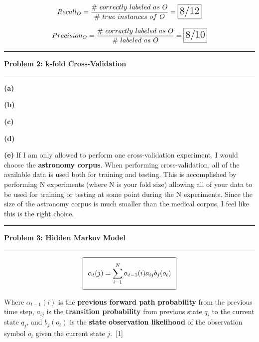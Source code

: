 \documentclass[11pt]{article}
\newcommand\question[2]{\vspace{.25in}\hrule\textbf{#1: #2}\vspace{.5em}\hrule\vspace{.10in}}
\renewcommand\part[1]{\vspace{.10in}\textbf{(#1)}}
\begin{document}
$$Recall_O = \frac{\# \ correctly \ labeled \ as \ O}{\# \ true \ instances \ of \ O} = \framebox[1.2\width]{\Large{8/12}}$$

$$Precision_O = \frac{\# \ correctly \ labeled \ as \ O}{\# \ labeled \ as \ O} = \framebox[1.2\width]{\Large{8/10}}$$

\question{Problem 2}{k-fold Cross-Validation}

\part{a} 

\part{b} 

\part{c} 

\part{d} 

\part{e} If I am only allowed to perform one cross-validation experiment, I would choose the \textbf{astronomy corpus}. When performing cross-validation, all of the available data is used both for training and testing. This is accomplished by performing N experiments (where N is your fold size) allowing all of your data to be used for training or testing at some point during the N experiments. Since the size of the astronomy corpus is much smaller than the medical corpus, I feel like this is the right choice.

\question{Problem 3}{Hidden Markov Model}

\begin{equation}
\setlength\fboxsep{0.25cm}
\setlength\fboxrule{0.4pt}
\boxed{\alpha_t(j) = \sum_{i = 1}^N \alpha_{t-1}(i)a_{ij}b_j(o_t)}
\end{equation}

Where $\alpha_{t-1}(i)$ is the \textbf{previous forward path probability} from the previous time step, $a_{ij}$ is the \textbf{transition probability} from previous state $q_i$ to the current state $q_j$, and $b_j(o_t)$ is the \textbf{state observation likelihood} of the observation symbol $o_t$ given the current state $j$.\ [1]
\end{document}

